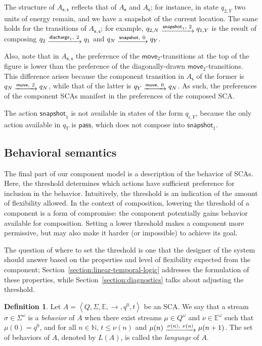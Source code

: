 \documentclass[a4paper]{article}
\newcommand{\naturals}{\mathbb{N}}
\newcommand{\angl}[1]{\left\langle#1\right\rangle}
\newcommand{\myrightarrow}[1]{\mathrel{\raisebox{-3pt}{$\xrightarrow{#1}$}}}
\newcommand{\abscsemiring}{\mathbb{E}}
\theoremstyle{definition}
\newtheorem{definition}{Definition}
\newcommand{\move}{\mathsf{move}}
\newcommand{\snapshot}{\mathsf{snapshot}}
\newcommand{\s}{\mathsf{s}}
\newcommand{\discharge}{\mathsf{discharge}}
\newcommand{\pass}{\mathsf{pass}}
\newcommand{\e}{\mathsf{e}}
\begin{document}
The structure of $A_{\e, \s}$ reflects that of $A_\e$ and $A_\s$; for instance, in state $q_{2,Y}$ two units of energy remain, and we have a snapshot of the current location. The same holds for the transitions of $A_{\e,\s}$; for example, $q_{2,N} \myrightarrow{\snapshot_1,\ 2} q_{1,Y}$ is the result of composing $q_2 \myrightarrow{\discharge_1,\ 2} q_1$ and $q_N \myrightarrow{\snapshot,\ 0} q_Y$. 

Also, note that in $A_{\e, \s}$ the preference of the $\move_2$-transitions at the top of the figure is lower than the preference of the diagonally-drawn $\move_2$-transitions. This difference arises because the component transition in $A_\s$ of the former is $q_N \myrightarrow{\move,\ 2} q_N$, while that of the latter is $q_Y \myrightarrow{\move,\ 0} q_N$. As such, the preferences of the component SCAs manifest in the preferences of the composed SCA\@.

The action $\snapshot_1$ is not available in states of the form $q_{i,Y}$, because the only action available in $q_Y$ is $\pass$, which does not compose into $\snapshot_1$.

\subsection{Behavioral semantics}%
\label{section:behavioral-semantics}

The final part of our component model is a description of the behavior of SCAs\@. Here, the threshold determines which actions have sufficient preference for inclusion in the behavior. Intuitively, the threshold is an indication of the amount of flexibility allowed. In the context of composition, lowering the threshold of a component is a form of compromise: the component potentially gains behavior available for composition. Setting a lower threshold makes a component more permissive, but may also make it harder (or impossible) to achieve its goal.

The question of where to set the threshold is one that the designer of the system should answer based on the properties and level of flexibility expected from the component; Section~\ref{section:linear-temporal-logic} addresses the formulation of these properties, while Section~\ref{section:diagnostics} talks about adjusting the threshold.

\begin{definition}%
\label{definition:language}
Let $A = \angl{Q, \Sigma, \abscsemiring, \rightarrow, q^0, t}$ be an SCA\@. We say that a stream $\sigma \in \Sigma^\omega$ is a \emph{behavior} of $A$ when there exist streams $\mu \in Q^\omega$ and $\nu \in \abscsemiring^\omega$ such that $\mu(0) = q^0$, and for all $n \in \naturals$, $t \leq \nu(n)$ and $\mu(n) \myrightarrow{\sigma(n),\ \nu(n)} \mu(n+1)$. The set of behaviors of $A$, denoted by $L(A)$, is called the \emph{language} of $A$.
\end{definition}
\end{document}

